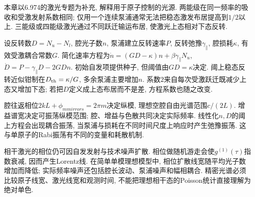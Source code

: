 本章以6.974的激光专题为补充, 解释用于原子控制的光源. 两能级在同一频率的吸收和受激发射系数相同; 仅用一个连续泵浦通常无法把稳态激发布居提高到$1/2$以上. 三能级或四能级激光通过不同跃迁输运布居, 使激光上态相对下态反转.

设反转数$D=N_u-N_l$, 腔光子数$n$, 泵浦建立反转速率$P$, 反转弛豫$\gamma_\parallel$, 腔损耗$\kappa$, 有效受激耦合常数$G$. 简化速率方程为$\dot n=(GD-\kappa)n+\beta\gamma_\parallel N_u$,$\dot D=P-\gamma_\parallel D-2GDn$. 初始自发项提供种子, 但阈值由$GD=\kappa$决定. 阈上稳态反转近似钳制在$D_{\rm th}=\kappa/G$, 多余泵浦主要增加$n$. 系数$2$来自每次受激跃迁既减少上态又增加下态; 若把$D$定义成上态布居而不是差, 方程系数也随之改变.

腔往返相位$2kL+\phi_{
m mirrors}=2\pi m$决定纵模, 理想空腔自由光谱范围$c/(2L)$. 增益谱宽决定可振荡纵模范围; 腔、增益与色散共同决定实际频率. 线性化$n,D$的阈上方程会出现耦合振荡, 当泵浦与损耗在不同时间尺度上响应时产生弛豫振荡. 这与单原子的Rabi振荡有不同的变量和耗散机制.

相干激光的相位仍可因自发发射与技术噪声扩散. 相位做随机游走会使$g^{(1)}(\tau)$指数衰减, 因而产生Lorentz线. 在简单单模理想模型中, 相位扩散线宽随平均光子数增加而降低; 实际频率噪声还包括腔长波动、泵浦噪声和幅相耦合. 精密光谱必须比较原子线宽、激光线宽和观测时间, 不能把理想相干态的Poisson统计直接理解为绝对单色.

